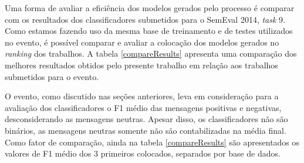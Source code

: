 \documentclass[12pt]{article}
\begin{document}
Uma forma de avaliar a eficiência dos modelos gerados pelo processo é comparar com os resultados dos classificadores submetidos para o SemEval 2014, \emph{task} 9. Como estamos fazendo uso da mesma base de treinamento e de testes utilizados no evento, é possível comparar e avaliar a colocação dos modelos gerados no \emph{ranking} dos trabalhos. A tabela \ref{compareResults} apresenta uma comparação dos melhores resultados obtidos pelo presente trabalho em relação aos trabalhos submetidos para o evento. 

O evento, como discutido nas seções anteriores, leva em consideração para a avaliação dos classificadores o F1 médio das mensagens positivas e negativas, desconsiderando as mensagens neutras. Apesar disso, os classificadores não são binários, as mensagens neutras somente não são contabilizadas na média final. Como fator de comparação, ainda na tabela \ref{compareResults} são apresentados os valores de F1 médio dos 3 primeiros colocados, separados por base de dados.
\end{document}
